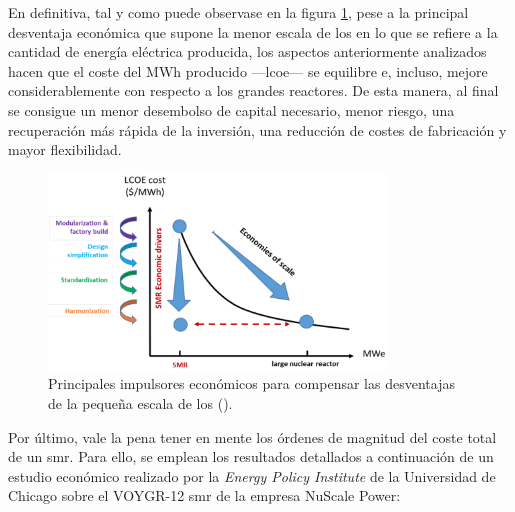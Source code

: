 En definitiva, tal y como puede observase en la figura \ref{fig:economy}, pese a la principal desventaja económica que supone la menor escala de los  en lo que se refiere a la cantidad de energía eléctrica producida, los aspectos anteriormente analizados hacen que el coste del MWh producido ---\acrfull{lcoe}--- se equilibre e, incluso, mejore considerablemente con respecto a los grandes reactores. De esta manera, al final se consigue un menor desembolso de capital necesario, menor riesgo, una recuperación más rápida de la inversión, una reducción de costes de fabricación y mayor flexibilidad.

\begin{figure}[h]
  \centering
  \includegraphics[width=0.8\textwidth]{content/figures/economy.png}
  \caption{Principales impulsores económicos para compensar las desventajas de la pequeña escala de los  (\cite{nea_smrs_2021}).}
  \label{fig:economy}
\end{figure}

Por último, vale la pena tener en mente los órdenes de magnitud del coste total de un \acrlong{smr}. Para ello, se emplean los resultados detallados a continuación de un estudio económico realizado por la \emph{Energy Policy Institute} de la Universidad de Chicago sobre el VOYGR-12 \acrshort{smr} de la empresa NuScale Power: 

